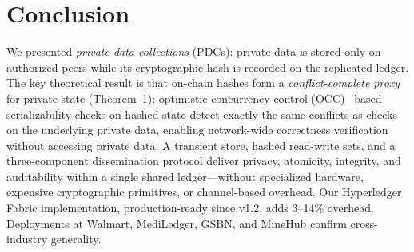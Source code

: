 \section{Conclusion}

We presented \textit{private data collections} (PDCs): private data is stored only on authorized peers while its cryptographic hash is recorded on the replicated ledger. The key theoretical result is that on-chain hashes form a \textit{conflict-complete proxy} for private state (Theorem~1): optimistic concurrency control (OCC)~\cite{occ} based serializability checks on hashed state detect exactly the same conflicts as checks on the underlying private data, enabling network-wide correctness verification without accessing private data. A transient store, hashed read-write sets, and a three-component dissemination protocol deliver privacy, atomicity, integrity, and auditability within a single shared ledger---without specialized hardware, expensive cryptographic primitives, or channel-based overhead. Our Hyperledger Fabric implementation, production-ready since v1.2, adds 3--14\% overhead. Deployments at Walmart, MediLedger, GSBN, and MineHub confirm cross-industry generality.
